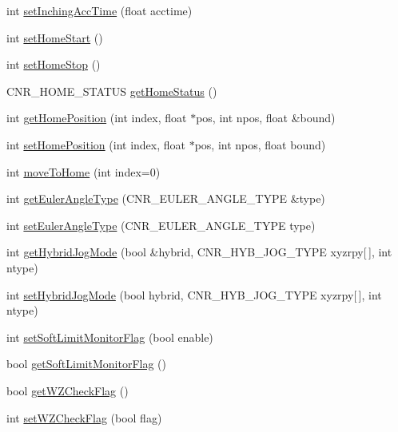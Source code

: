 \begin{DoxyCompactItemize}
\item 
int \hyperlink{classCNRobo_a19a2561761c75a7707c3328b5298d5ad}{set\-Inching\-Acc\-Time} (float acctime)
\item 
int \hyperlink{classCNRobo_a3b2c7370bd5a251e6c12f8ef25816e0e}{set\-Home\-Start} ()
\item 
int \hyperlink{classCNRobo_a72c703285a07198ed6df96fab6ace7da}{set\-Home\-Stop} ()
\item 
C\-N\-R\-\_\-\-H\-O\-M\-E\-\_\-\-S\-T\-A\-T\-U\-S \hyperlink{classCNRobo_a10ba3115f184c66ff6e587a5e8ecd0f1}{get\-Home\-Status} ()
\item 
int \hyperlink{classCNRobo_acdd15bc897307f9334db02a655ff9ab2}{get\-Home\-Position} (int index, float $\ast$pos, int npos, float \&bound)
\item 
int \hyperlink{classCNRobo_ae54dd1eb568bc6db6ba51bba7337376d}{set\-Home\-Position} (int index, float $\ast$pos, int npos, float bound)
\item 
int \hyperlink{classCNRobo_a58f1f05ca76a35a6d72e3952c976b852}{move\-To\-Home} (int index=0)
\item 
int \hyperlink{classCNRobo_a7c090b6c361d1b5fcd9d21805a749789}{get\-Euler\-Angle\-Type} (C\-N\-R\-\_\-\-E\-U\-L\-E\-R\-\_\-\-A\-N\-G\-L\-E\-\_\-\-T\-Y\-P\-E \&type)
\item 
int \hyperlink{classCNRobo_ae74f5a06c69f1ab8defcefc29bada0dc}{set\-Euler\-Angle\-Type} (C\-N\-R\-\_\-\-E\-U\-L\-E\-R\-\_\-\-A\-N\-G\-L\-E\-\_\-\-T\-Y\-P\-E type)
\item 
int \hyperlink{classCNRobo_a1612036026b834b60ece52c9d7b95965}{get\-Hybrid\-Jog\-Mode} (bool \&hybrid, C\-N\-R\-\_\-\-H\-Y\-B\-\_\-\-J\-O\-G\-\_\-\-T\-Y\-P\-E xyzrpy\mbox{[}$\,$\mbox{]}, int ntype)
\item 
int \hyperlink{classCNRobo_a9ecbcc0098c29f3eafda65f1edc84a09}{set\-Hybrid\-Jog\-Mode} (bool hybrid, C\-N\-R\-\_\-\-H\-Y\-B\-\_\-\-J\-O\-G\-\_\-\-T\-Y\-P\-E xyzrpy\mbox{[}$\,$\mbox{]}, int ntype)
\item 
int \hyperlink{classCNRobo_a654760f5470626b5d646b5da5aa8d3f8}{set\-Soft\-Limit\-Monitor\-Flag} (bool enable)
\item 
bool \hyperlink{classCNRobo_af7c7298217cd8f0d9f797b4a0f0aa89b}{get\-Soft\-Limit\-Monitor\-Flag} ()
\item 
bool \hyperlink{classCNRobo_a11fc16333a6ee6274c4799183381ba9e}{get\-W\-Z\-Check\-Flag} ()
\item 
int \hyperlink{classCNRobo_a458b4d445558a45d05d0af1b6865adae}{set\-W\-Z\-Check\-Flag} (bool flag)
\item 

\end{DoxyCompactItemize}
